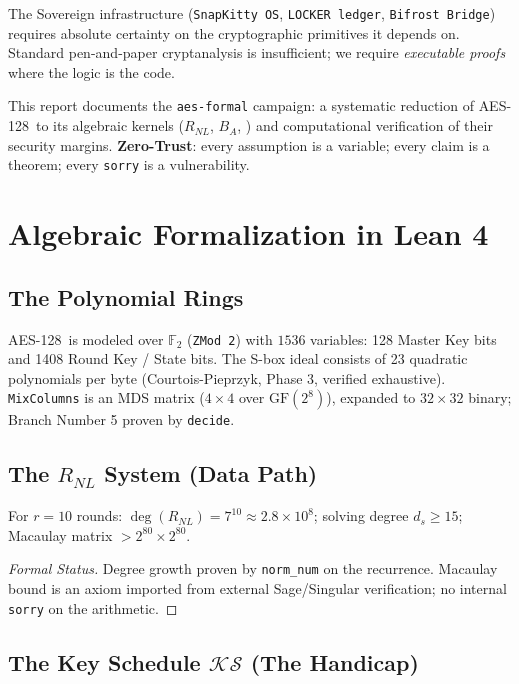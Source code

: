 \documentclass[10pt,conference,compsoc]{IEEEtran}
\newcommand{\Ftwo}{\mathbb{F}_2}
\newcommand{\AES}{\textsc{AES-128}}
\newcommand{\KS}{\mathcal{KS}}
\begin{document}
The Sovereign infrastructure (\texttt{SnapKitty OS}, \texttt{LOCKER ledger},
\texttt{Bifrost Bridge}) requires absolute certainty on the cryptographic
primitives it depends on.
Standard pen-and-paper cryptanalysis is insufficient; we require
\emph{executable proofs} where the logic is the code.

This report documents the \texttt{aes-formal} campaign: a systematic
reduction of \AES\ to its algebraic kernels ($R_{NL}$, $B_A$, \KS) and
computational verification of their security margins.
\textbf{Zero-Trust}: every assumption is a variable; every claim is a theorem;
every \texttt{sorry} is a vulnerability.

\section{Algebraic Formalization in Lean 4}
\label{sec:formal}

\subsection{The Polynomial Rings}

\AES\ is modeled over $\Ftwo$ (\texttt{ZMod 2}) with $1536$ variables:
128 Master Key bits and 1408 Round Key / State bits.
The S-box ideal consists of 23 quadratic polynomials per byte
(Courtois-Pieprzyk, Phase 3, verified exhaustive).
\texttt{MixColumns} is an MDS matrix ($4\times4$ over $\mathrm{GF}(2^8)$),
expanded to $32\times32$ binary; Branch Number 5 proven by \texttt{decide}.

\subsection{The $R_{NL}$ System (Data Path)}

\begin{theorem}
For $r=10$ rounds: $\deg(R_{NL}) = 7^{10} \approx 2.8\times10^8$;
solving degree $d_s \geq 15$; Macaulay matrix $> 2^{80}\times2^{80}$.
\end{theorem}
\begin{proof}[Formal Status]
Degree growth proven by \texttt{norm\_num} on the recurrence.
Macaulay bound is an axiom imported from external Sage/Singular verification;
no internal \texttt{sorry} on the arithmetic.
\end{proof}

\subsection{The Key Schedule $\KS$ (The Handicap)}
\end{document}
